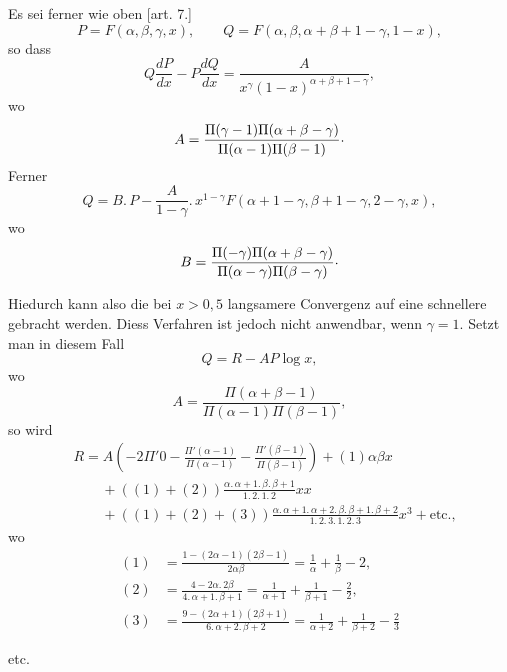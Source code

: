 \noindent\hspace*{\parindent}Es sei ferner wie oben [art. 7.]
\[
P=F(\alpha,\beta,\gamma,x),\qquad Q=F(\alpha,\beta,\alpha+\beta+1-\gamma,1-x),
\]
\noindent so dass
\[
Q\frac{dP}{dx}-P\frac{dQ}{dx}=\frac{A}{x^\gamma(1-x)^{\alpha+\beta+1-\gamma}},
\]
\noindent wo
\[
A=\frac{\Pi(\gamma-1)\Pi(\alpha+\beta-\gamma)}{\Pi(\alpha-1)\Pi(\beta-1)}\mathpunct{\raisebox{.35ex}{.}}
\]
\noindent Ferner
\[
Q=B{.}\,P-\frac{A}{1-\gamma}{.}\,x^{1-\gamma}F(\alpha+1-\gamma,\beta+1-\gamma,2-\gamma,x),
\]
\noindent wo
\[
B=\frac{\Pi(-\gamma)\Pi(\alpha+\beta-\gamma)}{\Pi(\alpha-\gamma)\Pi(\beta-\gamma)}\mathpunct{\raisebox{.35ex}{.}}
\]
\noindent{\small[S. 68]}\par
\indent Hiedurch kann also die bei $x>0{,}5$ langsamere Convergenz auf eine schnellere gebracht werden. Diess Verfahren ist jedoch nicht anwendbar, wenn $\gamma=1$. Setzt man in diesem Fall
\[
Q=R-AP\log x,
\]
\noindent wo
\[
A=\frac{\Pi(\alpha+\beta-1)}{\Pi(\alpha-1)\Pi(\beta-1)},
\]
\noindent so wird
\[
\begin{aligned}
&R=A\left(-2\Pi'0-\frac{\Pi'(\alpha-1)}{\Pi(\alpha-1)}-\frac{\Pi'(\beta-1)}{\Pi(\beta-1)}\right)+(1)\alpha\beta x\\[.7em]
&\qquad+((1)+(2))\frac{\alpha{.}\,\alpha+1{.}\,\beta{.}\,\beta+1}{1{.}\,2{.}\,1{.}\,2}xx\\[.7em]
&\qquad+((1)+(2)+(3))\frac{\alpha{.}\,\alpha+1{.}\,\alpha+2{.}\,\beta{.}\,\beta+1{.}\,\beta+2}{1{.}\,2{.}\,3{.}\,1{.}\,2{.}\,3}x^3+\mathrm{etc.},
\end{aligned}
\]
\noindent wo
\[
\begin{aligned}
(1)&=\frac{1-(2\alpha-1)(2\beta-1)}{2\alpha\beta}=\frac1\alpha+\frac1\beta-2,\\[.8em]
(2)&=\frac{4-2\alpha{.}\,2\beta}{4{.}\,\alpha+1{.}\,\beta+1}=\frac1{\alpha+1}+\frac1{\beta+1}-\frac22,\\[.8em]
(3)&=\frac{9-(2\alpha+1)(2\beta+1)}{6{.}\,\alpha+2{.}\,\beta+2}=\frac1{\alpha+2}+\frac1{\beta+2}-\frac23
\end{aligned}
\]
\begin{center}etc.\end{center}
\clearpage
